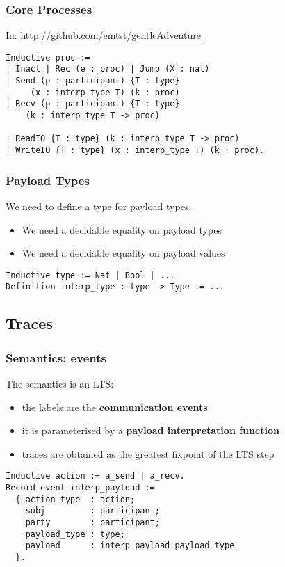 \begin{frame}[fragile]
    \frametitle{Core Processes}
    In: \url{http://github.com/emtst/gentleAdventure}
\vspace{.5cm}
    \begin{verbatim}
Inductive proc :=
| Inact | Rec (e : proc) | Jump (X : nat)
| Send (p : participant) {T : type}
     (x : interp_type T) (k : proc)
| Recv (p : participant) {T : type}
    (k : interp_type T -> proc)

| ReadIO {T : type} (k : interp_type T -> proc)
| WriteIO {T : type} (x : interp_type T) (k : proc).
    \end{verbatim}    
\end{frame}

\begin{frame}[fragile]
    \frametitle{Payload Types}
    We need to define a type for payload types:
    \begin{itemize}
    \item We need a decidable equality on payload types
    \item We need a decidable equality on payload values
    \end{itemize}
\vspace{1cm}
    \begin{verbatim}
Inductive type := Nat | Bool | ...
Definition interp_type : type -> Type := ...
    \end{verbatim}
\end{frame}

\subsection{Traces}


\begin{frame}[fragile]
    \frametitle{Semantics: events}
    The semantics is an LTS: 
    \begin{itemize}
    \item the labels are the \textbf{communication events}
    \item it is parameterised by a \textbf{payload interpretation function}
    \item traces are obtained as the greatest fixpoint of the LTS step
    \end{itemize}
\vspace{.5cm}
    \begin{verbatim}
Inductive action := a_send | a_recv.
Record event interp_payload :=
  { action_type  : action;
    subj         : participant;
    party        : participant;
    payload_type : type;
    payload      : interp_payload payload_type
  }.
    \end{verbatim}
\end{frame}

